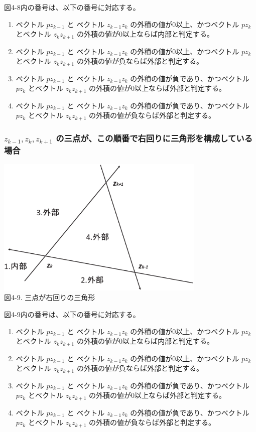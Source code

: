図4-8内の番号は、以下の番号に対応する。
\begin{enumerate}
 \item ベクトル $p z_{k-1}$ と ベクトル $z_{k-1} z_k$ の外積の値が0以上、かつベクトル $p z_k$ とベクトル $z_k z_{k+1}$ の外積の値が0以上ならば内部と判定する。
 \item ベクトル $p z_{k-1}$ と ベクトル $z_{k-1} z_k$ の外積の値が0以上、かつベクトル $p z_k$ とベクトル $z_k z_{k+1}$ の外積の値が負ならば外部と判定する。
 \item ベクトル $p z_{k-1}$ と ベクトル $z_{k-1} z_k$ の外積の値が負であり、かつベクトル $p z_k$ とベクトル $z_k z_{k+1}$ の外積の値が0以上ならば外部と判定する。
 \item ベクトル $p z_{k-1}$ と ベクトル $z_{k-1} z_k$ の外積の値が負であり、かつベクトル $p z_k$ とベクトル $z_k z_{k+1}$ の外積の値が負ならば外部と判定する。
\end{enumerate}

\subsubsection{$z_{k-1},z_k,z_{k+1}$ の三点が、この順番で右回りに三角形を構成している場合}

\begin{center}
  \includegraphics[width=10cm]{migimawari_vec.eps} \\
 \vspace{-1mm}
  図4-9. 三点が右回りの三角形
\end{center}

図4-9内の番号は、以下の番号に対応する。
\begin{enumerate}
 \item ベクトル $p z_{k-1}$ と ベクトル $z_{k-1} z_k$ の外積の値が0以上、かつベクトル $p z_k$ とベクトル $z_k z_{k+1}$ の外積の値が0以上ならば内部と判定する。
 \item ベクトル $p z_{k-1}$ と ベクトル $z_{k-1} z_k$ の外積の値が0以上、かつベクトル $p z_k$ とベクトル $z_k z_{k+1}$ の外積の値が負ならば外部と判定する。
 \item ベクトル $p z_{k-1}$ と ベクトル $z_{k-1} z_k$ の外積の値が負であり、かつベクトル $p z_k$ とベクトル $z_k z_{k+1}$ の外積の値が0以上ならば外部と判定する。
 \item ベクトル $p z_{k-1}$ と ベクトル $z_{k-1} z_k$ の外積の値が負であり、かつベクトル $p z_k$ とベクトル $z_k z_{k+1}$ の外積の値が負ならば外部と判定する。
\end{enumerate}


